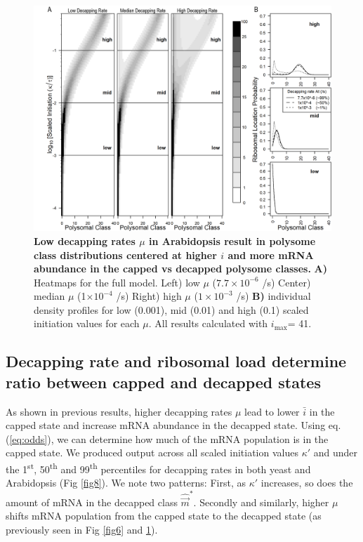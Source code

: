\documentclass[10pt,letterpaper]{article}
\newcommand{\imax}{\ensuremath{{i_{\max}}}\xspace}
\newcommand{\mvec}{\ensuremath{\vec{m}}\xspace}
\newcommand{\mvechat}{\ensuremath{\hat{\mvec}}\xspace}
\newcommand{\mvechatstar}{\ensuremath{\mvechat^*}\xspace}
\newcommand{\MRL}{\ensuremath{\bar{i}}\xspace}
\begin{document}
\begin{figure}[!h]
  \begin{center}
    \centering
    \includegraphics[width=140mm]{Images/2023-07-09_Figure2_At_Marking_Rate_range_medianlength_with_labels.png}
    \caption{{\bf Low decapping rates $\mu$ in Arabidopsis result in polysome class distributions centered at higher $i$ and more mRNA abundance in the capped vs decapped polysome classes.} {\bf  A)}  Heatmaps for the full model.
      Left) low $\mu$ ($7.7\times 10^{-6}$ /s) Center) median $\mu$ (1$\times 10^{-4}$ /s) Right) high $\mu$ ($1\times 10^{-3}$ /s) {\bf B)} individual density profiles for low (0.001), mid (0.01) and high (0.1) scaled initiation values for each $\mu$.
      All results calculated with \imax = 41.}
    \label{fig7}
  \end{center}
\end{figure}



\subsection*{Decapping rate and ribosomal load determine ratio between capped and decapped states}
As shown in previous results, higher decapping rates $\mu$ lead to lower \MRL in the capped state and increase mRNA abundance in the decapped state.
Using eq. (\ref{eq:odds}), we can determine how much of the mRNA population is in the capped state.
We produced output across all scaled initiation values $\kappa'$ and under the 1\textsuperscript{st}, 50\textsuperscript{th} and 99\textsuperscript{th} percentiles for decapping rates in both yeast and Arabidopsis (Fig \ref{fig8}). 
We note two patterns: First, as $\kappa'$ increases, so does the amount of mRNA in the decapped class  \mvechatstar. 
Secondly and similarly, higher $\mu$ shifts mRNA population from the capped state to the decapped state (as previously seen in Fig \ref{fig6} and \ref{fig7}).  
\end{document}
